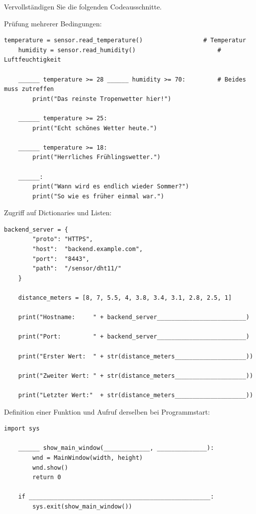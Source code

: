 \clearpage

Vervollständigen Sie die folgenden Codeausschnitte.

\bigskip
\teilaufgabe
Prüfung mehrerer Bedingungen:

\begin{Verbatim}[gobble=4]
    temperature = sensor.read_temperature()                 # Temperatur
    humidity = sensor.read_humidity()                       # Luftfeuchtigkeit

    ______ temperature >= 28 ______ humidity >= 70:         # Beides muss zutreffen
        print("Das reinste Tropenwetter hier!")

    ______ temperature >= 25:
        print("Echt schönes Wetter heute.")

    ______ temperature >= 18:
        print("Herrliches Frühlingswetter.")

    ______:
        print("Wann wird es endlich wieder Sommer?")
        print("So wie es früher einmal war.")

\end{Verbatim}

\teilaufgabe
Zugriff auf Dictionaries und Listen:

\begin{Verbatim}[gobble=4]
    backend_server = {
        "proto": "HTTPS",
        "host":  "backend.example.com",
        "port":  "8443",
        "path":  "/sensor/dht11/"
    }

    distance_meters = [8, 7, 5.5, 4, 3.8, 3.4, 3.1, 2.8, 2.5, 1]

    print("Hostname:     " + backend_server_________________________)

    print("Port:         " + backend_server_________________________)

    print("Erster Wert:  " + str(distance_meters____________________))

    print("Zweiter Wert: " + str(distance_meters____________________))

    print("Letzter Wert:"  + str(distance_meters____________________))
\end{Verbatim}

\clearpage
\teilaufgabe
Definition einer Funktion und Aufruf derselben bei Programmstart:

\begin{Verbatim}[gobble=4]
    import sys

    ______ show_main_window(_____________, ______________):
        wnd = MainWindow(width, height)
        wnd.show()
        return 0

    if ___________________________________________________:
        sys.exit(show_main_window())
\end{Verbatim}

